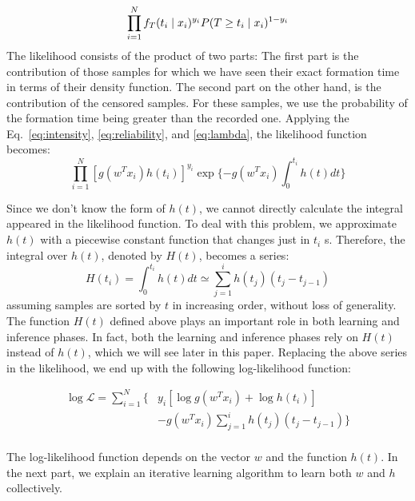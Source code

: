\begin{equation}
\prod_{i=1}^{N}f_T(t_i\mid x_i)^{y_i}P(T\ge t_i\mid x_i)^{1-y_i}\\
\end{equation}
The likelihood consists of the product of two parts: The first part is the contribution of those samples for which we have seen their exact formation time in terms of their density function. The second part on the other hand, is the contribution of the censored samples. For these samples, we use the probability of the formation time being greater than the recorded one. Applying the Eq.~\ref{eq:intensity}, \ref{eq:reliability}, and \ref{eq:lambda}, the likelihood function becomes:
\begin{equation}
\prod_{i=1}^{N}\left[g(w^Tx_i)h(t_i)\right]^{y_i}\exp\lbrace-g(w^Tx_i)\int_{0}^{t_i}h(t)dt\rbrace
\end{equation}

Since we don't know the form of $h(t)$, we cannot directly calculate the integral appeared in the likelihood function. To deal with this problem, we approximate $h(t)$ with a piecewise constant function that changes just in $t_i$ s. Therefore, the integral over $h(t)$, denoted by $H(t)$, becomes a series:
\begin{equation}\label{eq:cumh}
H(t_i)=\int_{0}^{t_i}h(t)dt \simeq \sum_{j=1}^{i}h(t_j)(t_j-t_{j-1})
\end{equation}
assuming samples are sorted by $t$ in increasing order, without loss of generality. The function $H(t)$ defined above plays an important role in both learning and inference phases. In fact, both the learning and inference phases rely on $H(t)$ instead of $h(t)$, which we will see later in this paper.
Replacing the above series in the likelihood, we end up with the following log-likelihood function:

\begin{equation}\label{eq:logl}
\begin{split}
\log\mathcal{L}
=\sum_{i=1}^{N}\Big\lbrace& y_i\left[\log g(w^Tx_i) + \log h(t_i)\right]\\&-g(w^Tx_i)\sum_{j=1}^{i}h(t_j)(t_j-t_{j-1})\Big\rbrace\\
\end{split}
\end{equation}

The log-likelihood function depends on the vector $w$ and the function $h(t)$. In the next part, we explain an iterative learning algorithm to learn both $w$ and $h$ collectively.

